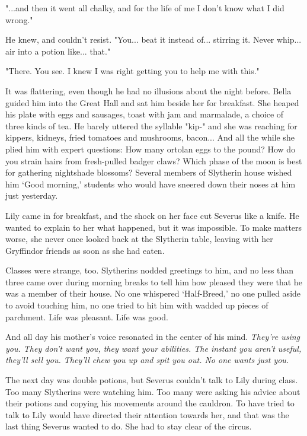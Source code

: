 \documentclass[a4paper,11pt]{article}
\begin{document}
"...and then it went all chalky, and for the life of me I don't know what I did wrong."

He knew, and couldn't resist. "You... beat it instead of... stirring it. Never whip... air into a potion like... that."

"There. You see. I knew I was right getting you to help me with this."

It was flattering, even though he had no illusions about the night before. Bella guided him into the Great Hall and sat him beside her for breakfast. She heaped his plate with eggs and sausages, toast with jam and marmalade, a choice of three kinds of tea. He barely uttered the syllable "kip-" and she was reaching for kippers, kidneys, fried tomatoes and mushrooms, bacon... And all the while she plied him with expert questions: How many ortolan eggs to the pound? How do you strain hairs from fresh-pulled badger claws? Which phase of the moon is best for gathering nightshade blossoms? Several members of Slytherin house wished him `Good morning,' students who would have sneered down their noses at him just yesterday.

Lily came in for breakfast, and the shock on her face cut Severus like a knife. He wanted to explain to her what happened, but it was impossible. To make matters worse, she never once looked back at the Slytherin table, leaving with her Gryffindor friends as soon as she had eaten.

Classes were strange, too. Slytherins nodded greetings to him, and no less than three came over during morning breaks to tell him how pleased they were that he was a member of their house. No one whispered `Half-Breed,' no one pulled aside to avoid touching him, no one tried to hit him with wadded up pieces of parchment. Life was pleasant. Life was good.

And all day his mother's voice resonated in the center of his mind. \emph{They're using you. They don't want you, they want your abilities. The instant you aren't useful, they'll sell you. They'll chew you up and spit you out. No one wants just you.}

The next day was double potions, but Severus couldn't talk to Lily during class. Too many Slytherins were watching him. Too many were asking his advice about their potions and copying his movements around the cauldron. To have tried to talk to Lily would have directed their attention towards her, and that was the last thing Severus wanted to do. She had to stay clear of the circus.
\end{document}
